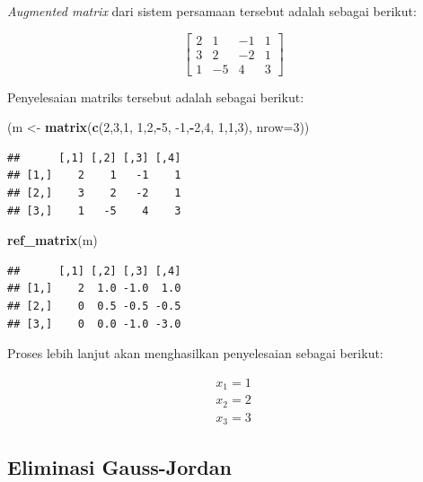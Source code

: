 \documentclass[]{book}
\newenvironment{Shaded}{\begin{snugshade}}{\end{snugshade}}
\newcommand{\DataTypeTok}[1]{\textcolor[rgb]{0.13,0.29,0.53}{#1}}
\newcommand{\DecValTok}[1]{\textcolor[rgb]{0.00,0.00,0.81}{#1}}
\newcommand{\KeywordTok}[1]{\textcolor[rgb]{0.13,0.29,0.53}{\textbf{#1}}}
\newcommand{\NormalTok}[1]{#1}
\newcommand{\OperatorTok}[1]{\textcolor[rgb]{0.81,0.36,0.00}{\textbf{#1}}}
\newcommand{\StringTok}[1]{\textcolor[rgb]{0.31,0.60,0.02}{#1}}
\theoremstyle{definition}
\theoremstyle{definition}
\theoremstyle{definition}
\theoremstyle{remark}
\begin{document}
\emph{Augmented matrix} dari sistem persamaan tersebut adalah sebagai berikut:

\[
\begin{bmatrix}
     2 & 1 & -1 & 1     \\[0.3em]
     3 & 2 & -2 & 1     \\[0.3em]
     1 & -5 & 4 & 3
\end{bmatrix}
\]

Penyelesaian matriks tersebut adalah sebagai berikut:

\begin{Shaded}
\begin{Highlighting}[]
\NormalTok{(m <-}\StringTok{ }\KeywordTok{matrix}\NormalTok{(}\KeywordTok{c}\NormalTok{(}\DecValTok{2}\NormalTok{,}\DecValTok{3}\NormalTok{,}\DecValTok{1}\NormalTok{,}
              \DecValTok{1}\NormalTok{,}\DecValTok{2}\NormalTok{,}\OperatorTok{-}\DecValTok{5}\NormalTok{,}
              \DecValTok{-1}\NormalTok{,}\OperatorTok{-}\DecValTok{2}\NormalTok{,}\DecValTok{4}\NormalTok{,}
              \DecValTok{1}\NormalTok{,}\DecValTok{1}\NormalTok{,}\DecValTok{3}\NormalTok{), }\DataTypeTok{nrow=}\DecValTok{3}\NormalTok{))}
\end{Highlighting}
\end{Shaded}

\begin{verbatim}
##      [,1] [,2] [,3] [,4]
## [1,]    2    1   -1    1
## [2,]    3    2   -2    1
## [3,]    1   -5    4    3
\end{verbatim}

\begin{Shaded}
\begin{Highlighting}[]
\KeywordTok{ref_matrix}\NormalTok{(m)}
\end{Highlighting}
\end{Shaded}

\begin{verbatim}
##      [,1] [,2] [,3] [,4]
## [1,]    2  1.0 -1.0  1.0
## [2,]    0  0.5 -0.5 -0.5
## [3,]    0  0.0 -1.0 -3.0
\end{verbatim}

Proses lebih lanjut akan menghasilkan penyelesaian sebagai berikut:

\[
\begin{matrix}
     x_1=1     \\[0.3em]
     x_2=2     \\[0.3em]
     x_3=3
\end{matrix}
\]

\hypertarget{redrowechelonform}{%
\subsection{Eliminasi Gauss-Jordan}\label{redrowechelonform}}
\end{document}
